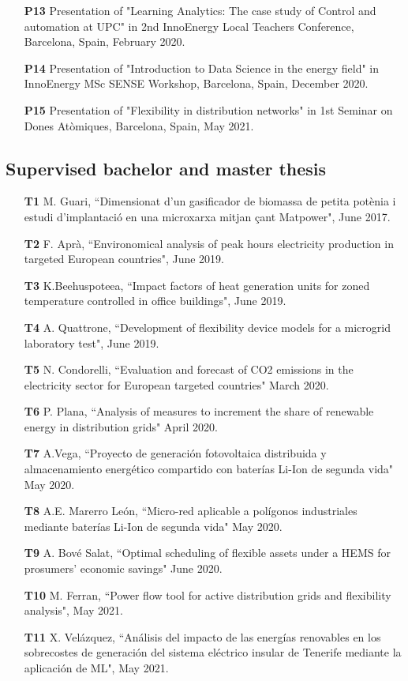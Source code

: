 \begin{itemize}
	\item [\textbf{P13}] Presentation of "Learning Analytics: The case study of Control and automation at UPC" in 2nd InnoEnergy Local Teachers Conference, Barcelona, Spain, February 2020.
	\item [\textbf{P14}] Presentation of "Introduction to Data Science in the energy field" in InnoEnergy MSc SENSE Workshop, Barcelona, Spain, December 2020.
	\item [\textbf{P15}] Presentation of "Flexibility in distribution networks" in 1st Seminar on Dones At\`{o}miques, Barcelona, Spain, May 2021.
\end{itemize}

\subsection*{Supervised bachelor and master thesis}

\begin{itemize}
	\item [\textbf{T1}] M. Guari, ``Dimensionat d'un gasificador de biomassa de petita pot\`{e}nia i estudi d'implantaci\'{o} en una microxarxa mitjan \c{c}ant Matpower", June 2017.
	\item [\textbf{T2}] F. Apr\`{a}, ``Environomical analysis of peak hours electricity production in targeted European countries", June 2019.
	\item [\textbf{T3}] K.Beehuspoteea,  ``Impact factors of heat generation units for zoned temperature controlled in office buildings", June 2019.
	\item [\textbf{T4}] A. Quattrone, ``Development of flexibility device models for a microgrid laboratory test", June 2019. 
	\item [\textbf{T5}] N. Condorelli, ``Evaluation and forecast of CO2 emissions in the
electricity sector for European targeted countries" March 2020.
	\item [\textbf{T6}] P. Plana, ``Analysis of measures to increment the share of renewable energy in distribution grids" April 2020.
	\item [\textbf{T7}] A.Vega, ``Proyecto de generaci\'{o}n fotovoltaica distribuida y almacenamiento energ\'{e}tico compartido con bater\'{i}as Li-Ion de segunda vida" May 2020.
	\item [\textbf{T8}] A.E. Marerro Le\'{o}n, ``Micro-red aplicable a pol\'{i}gonos industriales mediante bater\'{i}as Li-Ion de segunda vida" May 2020.
	\item [\textbf{T9}] A. Bov\'{e} Salat, ``Optimal scheduling of flexible assets under a HEMS for prosumers' economic savings" June 2020. 
	\item [\textbf{T10}] M. Ferran, ``Power flow tool for active distribution grids and flexibility analysis", May 2021. 
	\item [\textbf{T11}] X. Vel\'{a}zquez, ``An\'{a}lisis del impacto de las energ\'{i}as renovables en los sobrecostes de generaci\'{o}n del sistema el\'{e}ctrico insular de Tenerife mediante la aplicaci\'{o}n de ML", May 2021. 
	 
\end{itemize}

